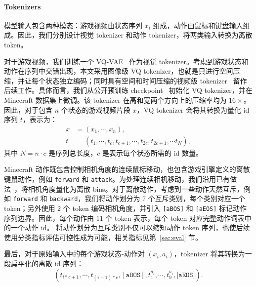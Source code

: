 \documentclass{article} %
\begin{document}
\paragraph{Tokenizers}
模型输入包含两种模态：游戏视频由状态序列 $x_i$ 组成，动作由鼠标和键盘输入组成。因此，我们分别设计视觉 tokenizer 和动作 tokenizer，将两类输入转换为离散 token。

对于游戏视频，我们训练一个 VQ-VAE~\citep{van2017neural,esser2021taming} 作为视觉 tokenizer。考虑到游戏状态和动作在序列中交错出现，本文采用图像级 VQ tokenizer，也就是只进行空间压缩，并让每个状态独立编码；同时具有空间和时间压缩的视频级 tokenizer~\citep{tang2024vidtok} 留作后续工作。具体而言，我们从公开预训练 checkpoint~\citep{patil2024amused} 初始化 VQ tokenizer，并在 Minecraft 数据集上微调。该 tokenizer 在高和宽两个方向上的压缩率均为 $16\times$。因此，对于包含 $n$ 个状态的游戏视频片段 $x$，VQ tokenizer 会将其转换为量化 id 序列 $t$，表示为：
\begin{equation} 
\begin{aligned}
x &= (x_1, \cdots,x_n), \\
t &= (t_1, \cdots, t_{c}, t_{c+1}, \cdots, t_{2c}, t_{2c+1}, \cdots t_N),
\end{aligned}
\end{equation}
其中 $N=n \cdot c$ 是序列总长度，$c$ 是表示每个状态所需的 id 数量。

Minecraft 动作既包含控制相机角度的连续鼠标移动，也包含游戏引擎定义的离散键鼠动作，例如 \texttt{forward} 和 \texttt{attack}。为处理连续相机移动，我们沿用已有做法~\citep{baker2022video}，将相机角度量化为离散 bins。对于离散动作，考虑到一些动作天然互斥，例如 \texttt{forward} 和 \texttt{backward}，我们将动作划分为 $7$ 个互斥类别，每个类别对应一个 token；另外使用 $2$ 个 token 编码相机角度，并引入 \texttt{[aBOS]} 和 \texttt{[aEOS]} 标记动作序列边界。因此，每个动作由 $11$ 个 token 表示，每个 token 对应完整动作词表中的一个动作 id。
将动作划分为互斥类别不仅可以缩短动作 token 序列，也使后续使用分类指标评估可控性成为可能，相关指标见第~\ref{sec:eval} 节。

最后，对于原始输入中的每个游戏状态-动作对 $(x_i, a_i)$，tokenizer 将其转换为一段扁平化的离散 id 序列：
\begin{equation}
    (t_{i*c+1}, \cdots, t_{(i+1)*c}, [\texttt{aBOS}], t^{a_i}_1, \cdots, t^{a_i}_9, \texttt{[aEOS]}).
\end{equation}

 
\end{document}

